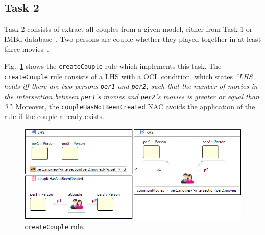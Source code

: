 \documentclass[draft]{llncs}
\newcommand{\code}[1]{{\texttt{#1}}}
\begin{document}
\subsection{Task 2}
Task 2 consists of extract all couples from a given model, either from Task 1 or IMBd database~\cite{todo}. Two persons are couple whether they played together in at least three movies~\cite{imdbcase}.

Fig.~\ref{fig:createCouple} shows the \code{createCouple} rule which implements this task. The \code{createCouple} rule consists of a LHS with a OCL condition, which states \textit{``LHS holds iff there are two persons \code{per1} and \code{per2}, such that the number of movies in the intersection between \code{per1}'s movies and \code{per2}'s movies is greater or equal than 3''}. Moreover, the \code{coupleHasNotBeenCreated} NAC avoids the application of the rule if the couple already exists. 

\begin{figure}[htp]
  \centering
  \includegraphics[width=\textwidth]{imgs/ruleCouples}
    \caption{\code{createCouple} rule.}\label{fig:createCouple}
\end{figure}



\providecommand{\url}[1]{\texttt{#1}}
\end{document}
